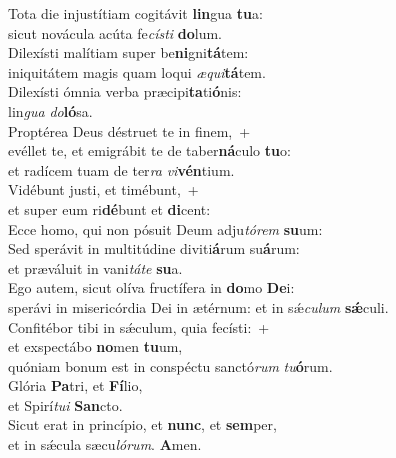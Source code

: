 \evenverse Tota die injustítiam cogitávit \textbf{lin}gua \textbf{tu}a:~\*\\
\evenverse sicut novácula acúta fe\textit{cí}\textit{sti} \textbf{do}lum.\\
\oddverse Dilexísti malítiam super be\textbf{ni}gni\textbf{tá}tem:~\*\\
\oddverse iniquitátem magis quam loqui \textit{æ}\textit{qui}\textbf{tá}tem.\\
\evenverse Dilexísti ómnia verba præcipi\textbf{ta}ti\textbf{ó}nis:~\*\\
\evenverse lin\textit{gua} \textit{do}\textbf{ló}sa.\\
\oddverse Proptérea Deus déstruet te in finem,~+\\
\oddverse  evéllet te, et emigrábit te de taber\textbf{ná}culo \textbf{tu}o:~\*\\
\oddverse et radícem tuam de ter\textit{ra} \textit{vi}\textbf{vén}tium.\\
\evenverse Vidébunt justi, et timébunt,~+\\
\evenverse  et super eum ri\textbf{dé}bunt et \textbf{di}cent:~\*\\
\evenverse Ecce homo, qui non pósuit Deum adju\textit{tó}\textit{rem} \textbf{su}um:\\
\oddverse Sed sperávit in multitúdine diviti\textbf{á}rum su\textbf{á}rum:~\*\\
\oddverse et præváluit in vani\textit{tá}\textit{te} \textbf{su}a.\\
\evenverse Ego autem, sicut olíva fructífera in \textbf{do}mo \textbf{De}i:~\*\\
\evenverse sperávi in misericórdia Dei in ætérnum: et in sǽ\textit{cu}\textit{lum} \textbf{sǽ}culi.\\
\oddverse Confitébor tibi in sǽculum, quia fecísti:~+\\
\oddverse  et exspectábo \textbf{no}men \textbf{tu}um,~\*\\
\oddverse quóniam bonum est in conspéctu sanctó\textit{rum} \textit{tu}\textbf{ó}rum.\\
\evenverse Glória \textbf{Pa}tri, et \textbf{Fí}lio,~\*\\
\evenverse et Spirí\textit{tu}\textit{i} \textbf{San}cto.\\
\oddverse Sicut erat in princípio, et \textbf{nunc}, et \textbf{sem}per,~\*\\
\oddverse et in sǽcula sæcu\textit{ló}\textit{rum}. \textbf{A}men.\\
